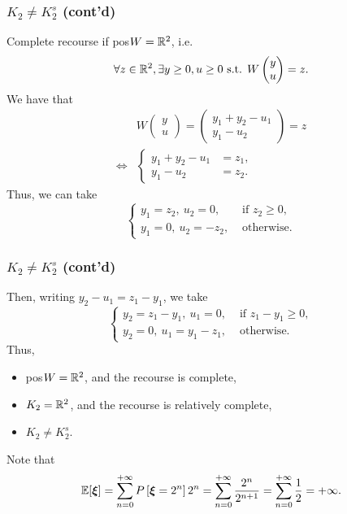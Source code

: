 \documentclass{beamer}
\def\bxi{\boldsymbol\xi}
\def\bxi{\boldsymbol\xi}
\begin{document}
\begin{frame}
\frametitle{$K_2 \ne K_2^s$ (cont'd)}

Complete recourse if pos$W = {\mathbb{R}}^2$, i.e.
$$
\forall z \in {\mathbb{R}}^2, \exists y \geq 0, u \geq 0 \text{ s.t. } W\begin{pmatrix} y \\ u \end{pmatrix} = z.
$$
We have that
\begin{align*}
& W\begin{pmatrix} y \\ u \end{pmatrix} = \begin{pmatrix} y_1 + y_2 - u_1 \\ y_1 - u_2 \end{pmatrix} = z \\
\Leftrightarrow &
\begin{cases}
	y_1 + y_2 - u_1 &= z_1, \\ y_1 - u_2 &= z_2.
\end{cases}
\end{align*}
Thus, we can take
$$
\begin{cases}
 y_1 = z_2,\ u_2 = 0, & \text{ if } z_2 \geq 0,\\
 y_1 = 0,\ u_2 = -z_2, & \text{ otherwise}.
\end{cases}
$$

\end{frame}

\begin{frame}
\frametitle{$K_2 \ne K_2^s$ (cont'd)}

Then, writing $y_2 - u_1 = z_1 - y_1$, we take
$$
\begin{cases}
	y_2 = z_1 - y_1,\ u_1 = 0, & \text{ if } z_1 - y_1 \geq 0,\\
	y_2 = 0,\ u_1 = y_1 - z_1, & \text{ otherwise}.
\end{cases}
$$
Thus,
\begin{itemize}
	\item 
	pos$W = {\mathbb{R}}^2$, and the recourse is complete,
	\item
	$K_2 = {\mathbb{R}}^2$, and the recourse is relatively complete,
	\item
	{\red $K_2 \ne K_2^s$}.
\end{itemize}

\mbox{}

Note that
$$
\EE[\bxi] = \sum_{n=0}^{+\infty} P\left[ \bxi = 2^n \right] 2^n = \sum_{n=0}^{+\infty} \frac{2^n}{2^{n+1}} = \sum_{n=0}^{+\infty} \frac{1}{2} = +\infty.
$$

\end{frame}
\end{document}
